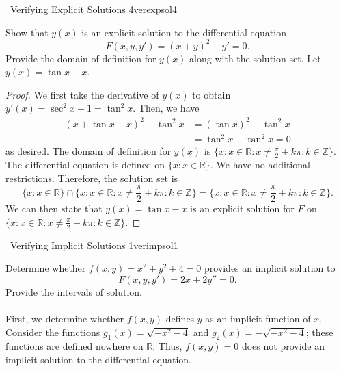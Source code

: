         \begin{example}{\Difficulty\,\Difficulty\,\,Verifying Explicit Solutions 4}{verexpsol4}
        
            Show that \(y(x)\) is an explicit solution to the differential equation
            \begin{equation*}
                F(x,y,y')=(x+y)^2-y'=0.
            \end{equation*}
            Provide the domain of definition for \(y(x)\) along with the solution set. Let \(y(x)=\tan x-x\).
            \begin{proof}
                We first take the derivative of \(y(x)\) to obtain \(y'(x)=\sec^2x-1=\tan^2x\). Then, we have
                \begin{align*}
                    (x+\tan x-x)^2-\tan^2x&=(\tan x)^2-\tan^2x \\
                    &=\tan^2x-\tan^2x=0
                \end{align*}
                as desired. The domain of definition for \(y(x)\) is \(\{x:x\in \mathbb{R}:x\neq \frac{\pi}{2}+k\pi:k\in\mathbb{Z}\}\). The differential equation is defined on \(\{x:x\in\mathbb{R}\}\). We have no additional restrictions. Therefore, the solution set is 
                \begin{equation*}
                    \{x:x\in\mathbb{R}\}\cap\{x:x\in \mathbb{R}:x\neq \frac{\pi}{2}+k\pi:k\in\mathbb{Z}\}=\{x:x\in \mathbb{R}:x\neq \frac{\pi}{2}+k\pi:k\in\mathbb{Z}\}.
                \end{equation*}
                We can then state that \(y(x)=\tan x-x\) is an explicit solution for \(F\) on \(\{x:x\in \mathbb{R}:x\neq \frac{\pi}{2}+k\pi:k\in\mathbb{Z}\}\).
            \end{proof}

        \end{example}
        \begin{example}{\Difficulty\,\Difficulty\,\,Verifying Implicit Solutions 1}{verimpsol1}
            
            Determine whether \(f(x,y)=x^2+y^2+4=0\) provides an implicit solution to
            \begin{equation*}
                F(x,y,y')=2x+2y''=0.
            \end{equation*}
            Provide the intervals of solution.
            \\
            \\
            First, we determine whether \(f(x,y)\) defines \(y\) as an implicit function of \(x\). Consider the functions \(g_1(x)=\sqrt{-x^2-4}\) and \(g_2(x)=-\sqrt{-x^2-4}\); these functions are defined nowhere on \(\mathbb{R}\). Thus, \(f(x,y)=0\) does not provide an implicit solution to the differential equation.

        \end{example}
